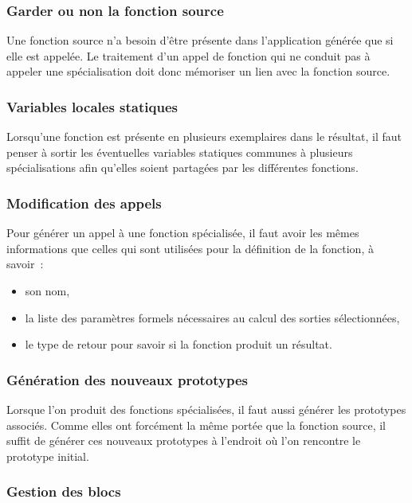 \subsubsection{Garder ou non la fonction source}

Une fonction source n'a besoin d'être présente dans l'application générée
que si elle est appelée.
Le traitement d'un appel de fonction qui ne conduit pas à appeler une
spécialisation doit donc mémoriser un lien avec la fonction source.

\subsubsection{Variables locales statiques}

Lorsqu'une fonction est présente en plusieurs exemplaires dans le résultat,
il faut penser à sortir les éventuelles variables statiques communes à plusieurs
spécialisations afin qu'elles soient partagées par les différentes fonctions.

\subsubsection{Modification des appels}\label{sec-filtre-call}

Pour générer un appel à une fonction spécialisée,
il faut avoir les mêmes informations que celles qui sont utilisées pour la
définition de la fonction, à savoir~:
\begin{itemize}
\item son nom,
\item la liste des paramètres formels nécessaires au calcul des sorties
sélectionnées,
\item le type de retour pour savoir si la fonction produit un résultat.
\end{itemize}

\subsubsection{Génération des nouveaux prototypes}

Lorsque l'on produit des fonctions spécialisées, il faut aussi 
générer les prototypes associés. Comme elles ont forcément la même portée que la
fonction source, il suffit de générer ces nouveaux prototypes à l'endroit où
l'on rencontre le prototype initial.

\subsubsection{Gestion des blocs}

